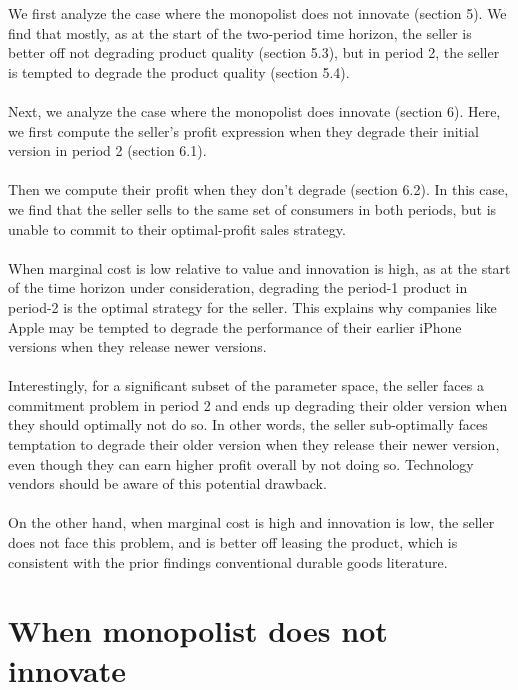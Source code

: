\documentclass{article}
\begin{document}
We first analyze the case where the monopolist does not innovate (section 5). We find that mostly, as at the start of the two-period time horizon,
the seller is better off not degrading product quality (section 5.3), but in period 2, the seller is tempted to degrade the product quality (section
5.4). \\
\\
Next, we analyze the case where the monopolist does innovate (section 6). Here, { }we first compute the seller{'}s profit expression when they degrade
their initial version in period 2 (section 6.1). \\
\\
Then we compute their profit when they don{'}t degrade (section 6.2). In this case, we find that the seller sells to the same set of consumers in
both periods, but is unable to commit to their optimal-profit sales strategy.\\
\\
When marginal cost is low relative to value and innovation is high, { }as at the start of the time horizon under consideration, degrading the period-1
product in period-2 is the optimal strategy for the seller. This explains why companies like Apple may be tempted to degrade the performance of their
earlier iPhone versions when they release newer versions.\\
\\
Interestingly, for a significant subset of the parameter space, the seller faces a commitment problem in period 2 and ends up degrading their older
version when they should optimally not do so. In other words, the seller sub-optimally faces temptation to degrade their older version when they
release their newer version, even though they can earn higher profit overall by not doing so. Technology vendors should be aware of this potential
drawback. \\
\\
On the other hand, when marginal cost is high and innovation is low, the seller does not face this problem, and is better off leasing the product,
which is consistent with the prior findings conventional durable goods literature. 

\section*{When monopolist does not innovate}
\end{document}
